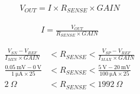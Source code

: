 \documentclass[12pt,a4paper]{article}
\begin{document}
		\begin{align}
		V_{OUT} = I \times R_{SENSE} \times GAIN \nonumber
	\end{align}
	
			\begin{align}
		I = \frac{V_{OUT}}{R_{SENSE} \times GAIN}
	\end{align}
	
			\begin{align}
		\frac{V_{SN} - V_{REF}}{I_{MIN} \times GAIN} &< R_{SENSE} < \frac{V_{SP} - V_{REF}}{I_{MAX} \times GAIN} \nonumber \\
		\frac{\qty{0.05}{\milli \volt} - \qty{0}{\volt}}{\qty{1}{\micro \ampere} \times 25} &< R_{SENSE} < \frac{\qty{5}{\volt} - \qty{20}{\milli  \volt}}{\qty{100}{\micro \ampere} \times 25} \nonumber \\
		\qty{2}{\Omega} &< R_{SENSE} < \qty{1992}{\Omega}
	\end{align}
	
\end{document}
